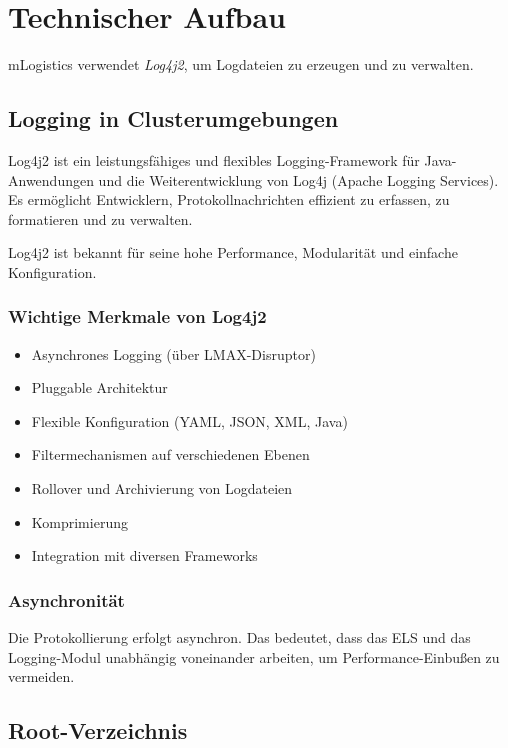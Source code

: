\chapter{Technischer Aufbau}

mLogistics verwendet \textit{Log4j2}, um Logdateien zu erzeugen und zu verwalten.

\section{Logging in Clusterumgebungen}

Log4j2 ist ein leistungsfähiges und flexibles Logging-Framework für Java-Anwendungen und die Weiterentwicklung von Log4j (Apache Logging Services).  
Es ermöglicht Entwicklern, Protokollnachrichten effizient zu erfassen, zu formatieren und zu verwalten.  

Log4j2 ist bekannt für seine hohe Performance, Modularität und einfache Konfiguration.

\subsection{Wichtige Merkmale von Log4j2}

\begin{itemize}
    \item Asynchrones Logging (über LMAX-Disruptor)
    \item Pluggable Architektur
    \item Flexible Konfiguration (YAML, JSON, XML, Java)
    \item Filtermechanismen auf verschiedenen Ebenen
    \item Rollover und Archivierung von Logdateien
    \item Komprimierung
    \item Integration mit diversen Frameworks
\end{itemize}

\subsection{Asynchronität}

Die Protokollierung erfolgt asynchron.  
Das bedeutet, dass das ELS und das Logging-Modul unabhängig voneinander arbeiten, um Performance-Einbußen zu vermeiden.

\section{Root-Verzeichnis}

